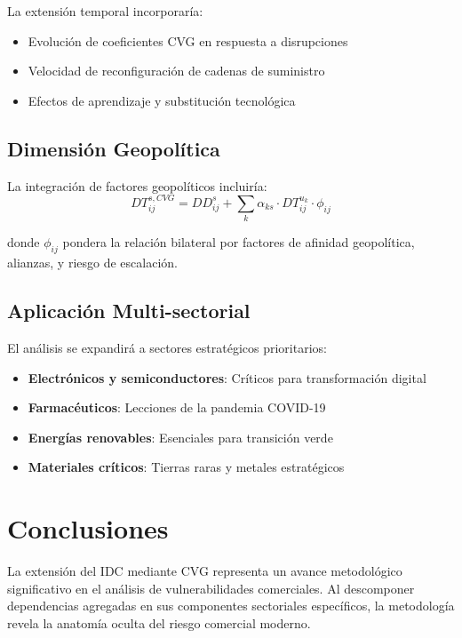 \documentclass[12pt,a4paper]{article}
\begin{document}
La extensión temporal incorporaría:
\begin{itemize}
    \item Evolución de coeficientes CVG en respuesta a disrupciones
    \item Velocidad de reconfiguración de cadenas de suministro
    \item Efectos de aprendizaje y substitución tecnológica
\end{itemize}

\subsection{Dimensión Geopolítica}

La integración de factores geopolíticos incluiría:
\begin{equation}
DT_{ij}^{s,CVG} = DD_{ij}^s + \sum_{k} \alpha_{ks} \cdot DT_{ij}^{u_k} \cdot \phi_{ij}
\end{equation}

donde $\phi_{ij}$ pondera la relación bilateral por factores de afinidad geopolítica, alianzas, y riesgo de escalación.

\subsection{Aplicación Multi-sectorial}

El análisis se expandirá a sectores estratégicos prioritarios:
\begin{itemize}
    \item \textbf{Electrónicos y semiconductores}: Críticos para transformación digital
    \item \textbf{Farmacéuticos}: Lecciones de la pandemia COVID-19
    \item \textbf{Energías renovables}: Esenciales para transición verde
    \item \textbf{Materiales críticos}: Tierras raras y metales estratégicos
\end{itemize}

\section{Conclusiones}

La extensión del IDC mediante CVG representa un avance metodológico significativo en el análisis de vulnerabilidades comerciales. Al descomponer dependencias agregadas en sus componentes sectoriales específicos, la metodología revela la anatomía oculta del riesgo comercial moderno.
\end{document}
